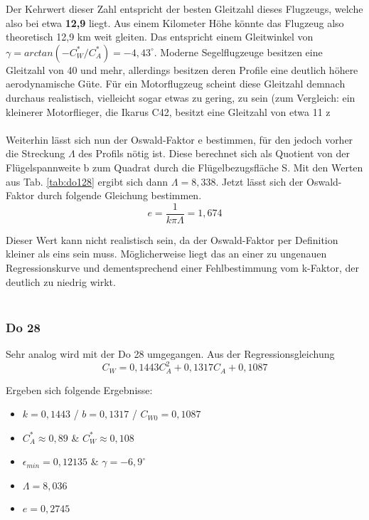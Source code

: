 \vspace{3mm} \noindent
Der Kehrwert dieser Zahl entspricht der besten Gleitzahl dieses Flugzeugs, welche also bei etwa \textbf{12,9} liegt. Aus einem Kilometer Höhe könnte das Flugzeug also theoretisch 12,9 km weit gleiten. Das entspricht einem Gleitwinkel von $\gamma =arctan(-C_W^*/C_A^*)=-4,43^\circ$. Moderne Segelflugzeuge besitzen eine Gleitzahl von 40 und mehr, allerdings besitzen deren Profile eine deutlich höhere aerodynamische Güte. Für ein Motorflugzeug scheint diese Gleitzahl demnach durchaus realistisch, vielleicht sogar etwas zu gering, zu sein (zum Vergleich: ein kleinerer Motorflieger, die Ikarus C42, besitzt eine Gleitzahl von etwa 11 z\\\\
Weiterhin lässt sich nun der Oswald-Faktor e bestimmen, für den jedoch vorher die Streckung $\Lambda$ des Profils nötig ist. Diese berechnet sich als Quotient von der Flügelspannweite b zum Quadrat durch die Flügelbezugsfläche S. Mit den Werten aus Tab. \ref{tab:do128} ergibt sich dann $\Lambda=8,338$. Jetzt lässt sich der Oswald-Faktor durch folgende Gleichung bestimmen.\\

\begin{equation}  
e=\frac{1}{k\pi \Lambda}=1,674
\end{equation}

\vspace{3mm} \noindent
Dieser Wert kann nicht realistisch sein, da der Oswald-Faktor per Definition kleiner als eins sein muss. Möglicherweise liegt das an einer zu ungenauen Regressionskurve und dementsprechend einer Fehlbestimmung vom k-Faktor, der deutlich zu niedrig wirkt.\\\\

\subsubsection{Do 28}
Sehr analog wird mit der Do 28 umgegangen. Aus der Regressionsgleichung\\

\begin{equation}
C_W=0,1443C_{A}^2+0,1317C_A+0,1087
\end{equation}

\vspace{3mm} \noindent
Ergeben sich folgende Ergebnisse:\\

\begin{itemize}
	\item $k=0,1443$ / $b=0,1317$ / $C_{W0}=0,1087$
	\item $C_{A}^* \approx 0,89$ \& $C_{W}^* \approx 0,108$
	\item $\epsilon_{min}=0,12135$ \& $\gamma =-6,9^\circ$
	\item $\Lambda=8,036$ 
	\item $e=0,2745$
\end{itemize}

